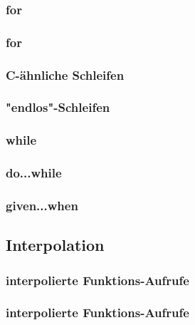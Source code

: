 \begin{frame}
	\frametitle{for}
	
	
\end{frame}
\begin{frame}
	\frametitle{for}
	
	
\end{frame}

\begin{frame}
	\frametitle{C-ähnliche Schleifen}
	
	
\end{frame}
\begin{frame}
	\frametitle{"endlos"-Schleifen}
	
	
\end{frame}

\begin{frame}
	\frametitle{while}
	
	
\end{frame}
\begin{frame}
	\frametitle{do...while}
	
	
\end{frame}
\begin{frame}
	\frametitle{given...when}
	
\end{frame}




\subsection{Interpolation}
\begin{frame}
	\frametitle{interpolierte Funktions-Aufrufe}
	
	
\end{frame}
\begin{frame}
	\frametitle{interpolierte Funktions-Aufrufe}
	
	
\end{frame}





